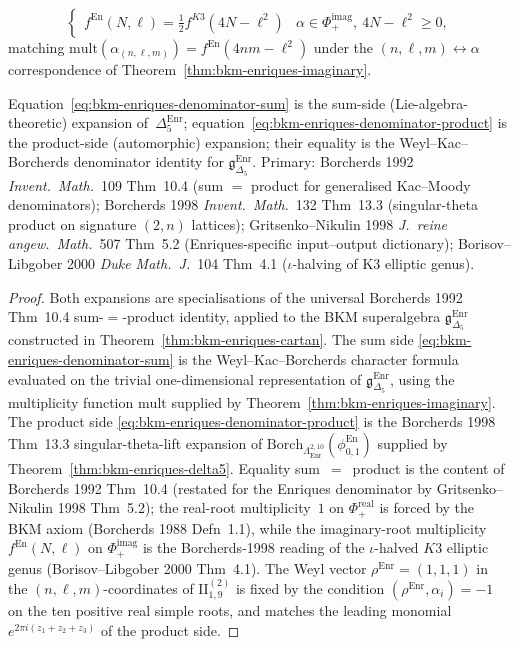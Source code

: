 \begin{theorem}
\begin{itemize}
\[\begin{cases}
 f^{\mathrm{En}}(N,\ell)
 = \tfrac{1}{2} f^{K3}(4N-\ell^2) & \alpha\in\Phi_+^{\mathrm{imag}},\ 4N-\ell^2\geq 0,
 \end{cases}
 \]
 matching $\mathrm{mult}(\alpha_{(n,\ell,m)})
 = f^{\mathrm{En}}(4nm-\ell^2)$ under the $(n,\ell,m)\leftrightarrow\alpha$
 correspondence of
 Theorem~\textup{\ref{thm:bkm-enriques-imaginary}}.
\end{itemize}
Equation~\eqref{eq:bkm-enriques-denominator-sum} is the
sum-side (Lie-algebra-theoretic) expansion of~$\Delta_5^{\mathrm{Enr}}$;
equation~\eqref{eq:bkm-enriques-denominator-product} is the
product-side (automorphic) expansion; their equality is the
Weyl--Kac--Borcherds denominator identity for
$\mathfrak{g}_{\Delta_5}^{\mathrm{Enr}}$.
Primary: Borcherds 1992 \emph{Invent.\ Math.}~109 Thm~10.4
(sum $=$ product for generalised Kac--Moody denominators);
Borcherds 1998 \emph{Invent.\ Math.}~132 Thm~13.3
(singular-theta product on signature $(2,n)$ lattices);
Gritsenko--Nikulin 1998 \emph{J.\ reine angew.\ Math.}~507 Thm~5.2
(Enriques-specific input--output dictionary);
Borisov--Libgober 2000 \emph{Duke Math.\ J.}~104 Thm~4.1
($\iota$-halving of K3 elliptic genus).
\end{theorem}

\begin{proof}[Proof]
Both expansions are specialisations of the universal Borcherds 1992
Thm~10.4 sum-$=$-product identity, applied to the BKM superalgebra
$\mathfrak{g}_{\Delta_5}^{\mathrm{Enr}}$ constructed in
Theorem~\ref{thm:bkm-enriques-cartan}. The sum side
\eqref{eq:bkm-enriques-denominator-sum} is the Weyl--Kac--Borcherds
character formula evaluated on the trivial one-dimensional
representation of $\mathfrak{g}_{\Delta_5}^{\mathrm{Enr}}$, using the
multiplicity function $\mathrm{mult}$ supplied by
Theorem~\ref{thm:bkm-enriques-imaginary}. The product side
\eqref{eq:bkm-enriques-denominator-product} is the
Borcherds 1998 Thm~13.3 singular-theta-lift expansion of
$\mathrm{Borch}_{\Lambda^{2,10}_{\mathrm{Enr}}}(\phi^{\mathrm{En}}_{0,1})$
supplied by Theorem~\ref{thm:bkm-enriques-delta5}. Equality
sum~$=$~product is the content of Borcherds 1992 Thm~10.4
(restated for the Enriques denominator by Gritsenko--Nikulin 1998
Thm~5.2); the real-root multiplicity~$1$ on $\Phi_+^{\mathrm{real}}$
is forced by the BKM axiom (Borcherds 1988 Defn~1.1), while the
imaginary-root multiplicity $f^{\mathrm{En}}(N,\ell)$ on
$\Phi_+^{\mathrm{imag}}$ is the Borcherds-1998 reading of the
$\iota$-halved $K3$ elliptic genus (Borisov--Libgober 2000 Thm~4.1).
The Weyl vector $\rho^{\mathrm{Enr}} = (1,1,1)$ in the
$(n,\ell,m)$-coordinates of $\mathrm{II}_{1,9}^{(2)}$ is fixed by
the condition $(\rho^{\mathrm{Enr}},\alpha_i) = -1$ on the ten
positive real simple roots, and matches the leading monomial
$e^{2\pi i(z_1+z_2+z_3)}$ of the product side.
\end{proof}

